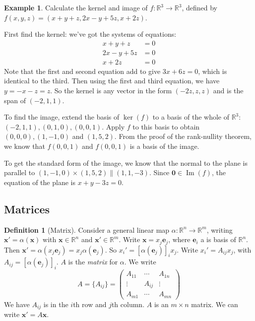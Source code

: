 \documentclass[a4paper]{article}
\theoremstyle{definition}
\newtheorem*{defi}{Definition}
\newtheorem*{eg}{Example}
\newcommand{\mb}[1]{\mathbf{#1}}
\newcommand{\R}{\mathbb{R}}
\DeclareMathOperator\im{Im}
\begin{document}
\begin{eg}
  Calculate the kernel and image of $f:\R^3\to \R^3$, defined by $f(x, y, z) = (x + y + z, 2x - y+ 5z, x + 2z)$.

  First find the kernel: we've got the systems of equations:
  \begin{align*}
    x + y + z &= 0\\
    2x - y + 5z &= 0\\
    x + 2z  &= 0
  \end{align*}
  Note that the first and second equation add to give $3x + 6z = 0$, which is identical to the third. Then using the first and third equation, we have $y = -x - z = z$. So the kernel is any vector in the form $(-2z, z, z)$ and is the span of $(-2, 1, 1)$.

  To find the image, extend the basis of $\ker(f)$ to a basis of the whole of $\R^3$: $(-2, 1, 1), (0, 1, 0), (0, 0, 1)$. Apply $f$ to this basis to obtain $(0, 0, 0), (1, -1, 0)$ and $(1, 5, 2)$. From the proof of the rank-nullity theorem, we know that $f(0, 0, 1)$ and $f(0, 0, 1)$ is a basis of the image.

  To get the standard form of the image, we know that the normal to the plane is parallel to $(1, -1, 0)\times (1, 5, 2) \parallel (1, 1, -3)$. Since $\mb{0}\in \im (f)$, the equation of the plane is $x + y - 3z = 0$.
\end{eg}

\subsection{Matrices}
\begin{defi}[Matrix]
  Consider a general linear map $\alpha: \R^n\to \R^m$, writing $\mb{x}' = \alpha(\mb{x})$ with $\mb{x}\in \R^n$ and $\mb{x}'\in \R^m$. Write $\mb{x} = x_j\mb{e}_j$, where $\mb{e}_i$ a is basis of $\R^n$. Then $\mb{x}' = \alpha (x_j\mb{e}_j) = x_j\alpha(\mb{e}_j)$. So $x_i' = [\alpha(\mb{e}_j)]_ix_j$. Write $x_i' = A_{ij}x_j$, with $A_{ij} = [\alpha(\mb{e}_j)]_i$. $A$ is the \emph{matrix} for $\alpha$. We write
\[
A = \{A_{ij}\} =
\begin{pmatrix}
  A_{11} & \cdots & A_{1n}\\
  \vdots & A_{ij} & \vdots\\
  A_{m1} & \cdots & A_{mn}
\end{pmatrix}
\]
We have $A_{ij}$ is in the $i$th row and $j$th column. $A$ is an $m\times n$ matrix. We can write $\mb{x'} = A\mb{x}$.
\end{defi}
\end{document}
